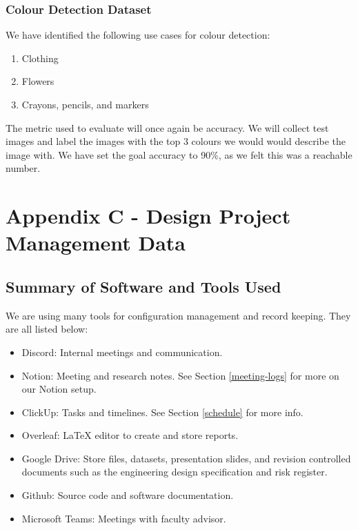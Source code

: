 \documentclass[a4paper,11pt]{article}
\begin{document}
\subsubsection{Colour Detection Dataset}
We have identified the following use cases for colour detection:

\begin{enumerate}
    \item Clothing
    \item Flowers
    \item Crayons, pencils, and markers
\end{enumerate}

The metric used to evaluate will once again be accuracy. We will collect test images and label the images with the top 3 colours we would would describe the image with. We have set the goal accuracy to 90\%, as we felt this was a reachable number.

\section{Appendix C - Design Project Management Data}
\label{appendix-c}

\subsection{Summary of Software and Tools Used}
We are using many tools for configuration management and record keeping. They are all listed below:

\begin{itemize}
    \item Discord: Internal meetings and communication.
    \item Notion: Meeting and research notes. See Section \ref{meeting-logs} for more on our Notion setup.
    \item ClickUp: Tasks and timelines. See Section \ref{schedule} for more info.
    \item Overleaf: LaTeX editor to create and store reports.
    \item Google Drive: Store files, datasets, presentation slides, and revision controlled documents such as the engineering design specification and risk register.
    \item Github: Source code and software documentation.
    \item Microsoft Teams: Meetings with faculty advisor.
\end{itemize}
\end{document}
